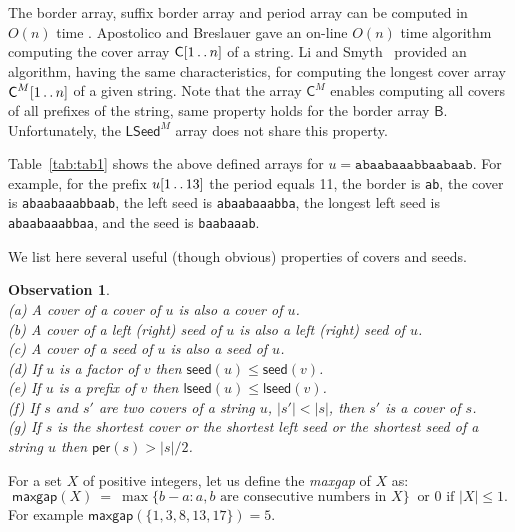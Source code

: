 \documentclass{llncs}
\newtheorem{observation}[lemma]{Observation}
\newcommand{\per}{\textsf{per}}
\newcommand{\lseed}{\textsf{lseed}}
\newcommand{\seed}{\textsf{seed}}
\newcommand{\Cover}{\textsf{C}}
\newcommand{\LSeed}{\textsf{LSeed}}
\newcommand{\Border}{\textsf{B}}
\newcommand{\maxgap}{\textsf{maxgap}}
\def\dotdot{\mathinner{\ldotp\ldotp}}
\begin{document}
    \noindent
    The border array, suffix border array and period array can be computed in $O(n)$ time
    \cite{AlgorithmsOnStrings,Jewels}.
    Apostolico and Breslauer \cite{DBLP:conf/birthday/ApostolicoB97,DBLP:journals/ipl/Breslauer92}
    gave an on-line $O(n)$ time algorithm computing the cover array $\Cover [1 \dotdot n]$ of a string.
    Li and Smyth~\cite{DBLP:journals/algorithmica/LiS02} provided an algorithm,
    having the same characteristics, for computing the longest cover array $\Cover^M [1 \dotdot n]$ of a given string.
    Note that the array $\Cover^M$ enables computing all covers of all prefixes of the string,
    same property holds for the border array $\Border$.
    Unfortunately, the $\LSeed^M$ array does not share this property.

    Table~\ref{tab:tab1} shows the above defined arrays for $u=\texttt{abaabaaabbaabaab}$.
    For example, for the prefix $u[1 \dotdot 13]$ the period equals 11, the border is \texttt{ab},
    the cover is \texttt{abaabaaabbaab}, the left seed is \texttt{abaabaaabba},
    the longest left seed is \texttt{abaabaaabbaa}, and the seed is \texttt{baabaaab}.

    We list here several useful (though obvious) properties of covers and seeds.

     \begin{observation}\label{obs:properties}~\\
       (a) A cover of a cover of $u$ is also a cover of $u$.\\
       (b) A cover of a left (right) seed of $u$ is also a left (right) seed of $u$.\\
       (c) A cover of a seed of $u$ is also a seed of $u$.\\
       (d) If $u$ is a factor of $v$ then $\seed(u)  \le \seed(v)$.\\
       (e) If $u$ is a prefix of $v$ then $\lseed(u) \le \lseed(v)$.\\
       (f) If $s$ and $s'$ are two covers of a string $u$, $|s'|<|s|$, then $s'$ is a cover of $s$.\\
       (g) If $s$ is the shortest cover or the shortest left seed or the shortest seed of a string $u$ then
       $\per(s) > |s|/2$.
      \end{observation}

    \noindent
    For a set $X$ of positive integers, let us define the \emph{maxgap} of $X$ as:
    $$\maxgap(X)\ =\ \max\{b-a : a, b \mbox{ are consecutive numbers in } X\} \ 
    \mbox{ or }0\mbox{ if }|X| \le 1.$$
    For example $\maxgap(\{1,3,8,13,17\})=5$.
\end{document}
